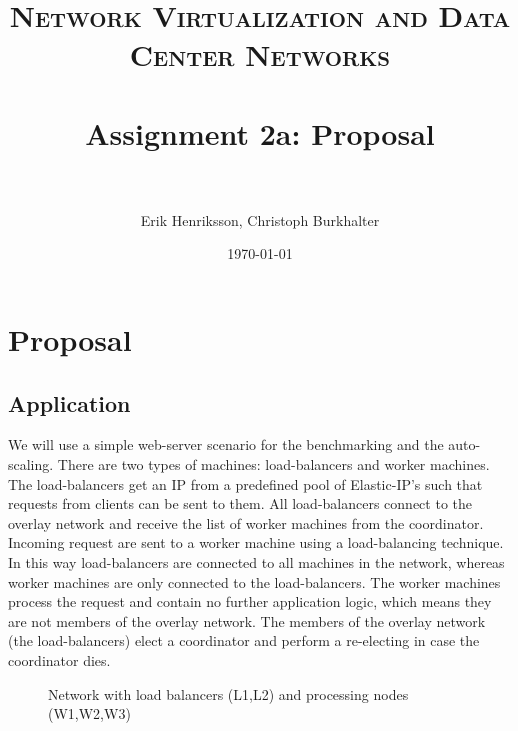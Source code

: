 \documentclass[paper=a4, fontsize=11pt]{scrartcl} %
\title{	
\normalfont \normalsize 
\textsc{Network Virtualization and Data Center Networks} \\ [25pt] %
\horrule{0.5pt} \\[0.4cm] %
\huge Assignment 2a: Proposal\\ %
\horrule{2pt} \\[0.5cm] %
}
\author{Erik Henriksson, Christoph Burkhalter} %
\date{\normalsize\today} %
\numberwithin{equation}{section} %
\numberwithin{figure}{section} %
\numberwithin{table}{section} %
\begin{document}
\maketitle %

\section{Proposal}

\subsection{Application}


We will use a simple web-server scenario for the benchmarking and the auto-scaling. There are two types of machines: load-balancers and worker machines. The load-balancers get an IP from a predefined pool of Elastic-IP's such that requests from clients can be sent to them. All load-balancers connect to the overlay network and receive the list of worker machines from the coordinator. Incoming request are sent to a worker machine using a load-balancing technique. In this way load-balancers are connected to all machines in the network, whereas worker machines are only connected to the load-balancers.
The worker machines process the request and contain no further application logic, which means they are not members of the overlay network.
The members of the overlay network (the load-balancers) elect a coordinator and perform a re-electing in case the coordinator dies.


\begin{figure}[h!]
\begin{center}
\end{center}

\caption{Network with load balancers (L1,L2) and processing nodes (W1,W2,W3)}
\end{figure}
\end{document}
